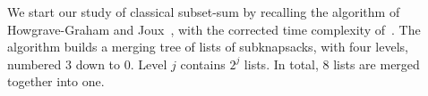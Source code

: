 We start our study of classical subset-sum by recalling the algorithm of Howgrave-Graham and Joux~\cite{DBLP:conf/eurocrypt/Howgrave-GrahamJ10}, with the corrected time complexity of~\cite{DBLP:conf/eurocrypt/BeckerCJ11}.
The algorithm builds a merging tree of lists of subknapsacks, with four levels, numbered $3$ down to $0$. Level $j$ contains $2^j$ lists. In total, $8$ lists are merged together into one.
